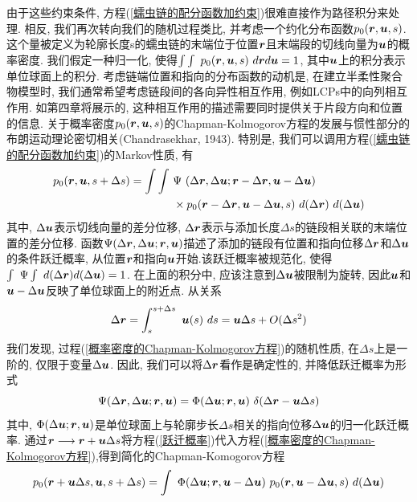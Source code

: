 由于这些约束条件, 方程(\ref{蠕虫链的配分函数加约束})很难直接作为路径积分来处理. 相反, 我们再次转向我们的随机过程类比, 并考虑一个约化分布函数$p_0(\bm{r},\bm{u},s)$. 这个量被定义为轮廓长度s的蠕虫链的末端位于位置$\bm{r}$且末端段的切线向量为$\bm{u}$的概率密度. 我们假定一种归一化, 使得$\int \int  \ p_0(\bm{r},\bm{u},s)\ d\bm{r} d\bm{u}=1$, 其中$\bm{u}$上的积分表示单位球面上的积分. 考虑链端位置和指向的分布函数的动机是, 在建立半柔性聚合物模型时, 我们通常希望考虑链段间的各向异性相互作用, 例如LCPs中的向列相互作用. 如第四章将展示的, 这种相互作用的描述需要同时提供关于片段方向和位置的信息. 
关于概率密度$p_0(\bm{r},\bm{u},s)$的Chapman-Kolmogorov方程的发展与惯性部分的布朗运动理论密切相关(Chandrasekhar, 1943). 特别是, 我们可以调用方程(\ref{蠕虫链的配分函数加约束})的Markov性质, 有\\
\begin{equation}
\begin{aligned}
	p_0(\bm{r},\bm{u},s+\Delta s)=\int \int \ &\Psi\  (\Delta \bm{r},\Delta \bm{u};\bm{r}-\Delta \bm{r},\bm{u}-\Delta \bm{u})\\ &\times p_0(\bm{r}-\Delta \bm{r},\bm{u}-\Delta \bm{u},s) \  d(\Delta \bm{r}) \ d(\Delta \bm{u})\label{概率密度的Chapman-Kolmogorov方程}
\end{aligned}
\end{equation}
其中, $\Delta\bm{u}$表示切线向量的差分位移, $\Delta \bm{r}$表示与添加长度$\Delta s$的链段相关联的末端位置的差分位移. 函数$\Psi(\Delta \bm{r},\Delta \bm{u};\bm{r},\bm{u})$描述了添加的链段有位置和指向位移$\Delta \bm{r}$和$\Delta \bm{u}$的条件跃迁概率, 从位置$\bm{r}$和指向$\bm{u}$开始.该跃迁概率被规范化, 使得$\int \ \Psi \int\ d(\Delta \bm{r}) d(\Delta \bm{u})=1$. 在上面的积分中, 应该注意到$\Delta\bm{u}$被限制为旋转, 因此$\bm{u}$和$\bm{u}-\Delta \bm{u}$反映了单位球面上的附近点. 从关系\\
\begin{equation}
\Delta \br = \int_{s}^{s+\Delta s}\ \bu(s)\ 
ds= \bu\Delta s +O(\Delta s ^2)
\end{equation}
我们发现, 过程(\ref{概率密度的Chapman-Kolmogorov方程})的随机性质, 在$\Delta s$上是一阶的, 仅限于变量$\Delta \bm{u}$. 因此, 我们可以将$\Delta \bm{r}$看作是确定性的, 并降低跃迁概率为形式\\
\begin{equation}
	\Psi(\Delta \bm{r} ,\Delta \bm{u} ;\bm{r}, \bm{u})=\Phi(\Delta \bm{u};\bm{r},\bm{u})\ \delta(\Delta \bm{r}-\bm{u}\Delta s)\label{跃迁概率}
\end{equation}
其中, $\Phi(\Delta \bm{u};\bm{r},\bm{u})$是单位球面上与轮廓步长$\Delta s$相关的指向位移$\Delta \bm{u}$的归一化跃迁概率. 通过$\bm{r}\longrightarrow \bm{r}+\bm{u}\Delta s$将方程(\ref{跃迁概率})代入方程(\ref{概率密度的Chapman-Kolmogorov方程}),得到简化的Chapman-Komogorov方程\\
\begin{equation}
	p_0(\br+\bu\Delta s,\bu,s+\Delta s)=\int\ \Phi(\Delta \bu ;\br,\bu-\Delta \bu)\ p_0(\br,\bu-\Delta \bu,s)\  d (\Delta \bu)\label{简化的Chapman-Komogorov方程}
\end{equation}

